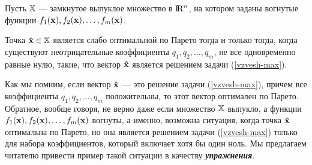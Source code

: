     \begin{teo}\label{par-opt-neobh-i-dost}
Пусть $\mathbb{X}$ --- замкнутое выпуклое множество в ${\rm I\!R}^n$, на котором
заданы вогнутые функции $f_1(\mathbf{x}), f_2(\mathbf{x}), \ldots,
f_m(\mathbf{x})$.

Точка $\mathbf{\hat x} \in \mathbb{X}$ является слабо оптимальной по Парето тогда и только тогда,
когда существуют неотрицательные коэффициенты $q_1, q_2, \ldots, q_m$, не все одновременно
равные нулю, такие, что вектор $\mathbf{\hat x}$ является решением задачи (\ref{vzvesh-max}).

\end{teo}

    Как мы помним, если вектор $\mathbf{\hat x}$ --- это решение задачи
    (\ref{vzvesh-max}), причем все коэффициенты $q_1, q_2, \ldots,
    q_m$ положительны, то этот вектор оптимален по Парето. Обратное,
    вообще говоря, не верно даже если множество $\mathbb{X}$
    выпукло, а функции
    $f_1(\mathbf{x}), f_2(\mathbf{x}), \ldots,  f_m(\mathbf{x})$
    вогнуты, а именно, возможна ситуация, когда точка $\mathbf{\hat x}$
    оптимальна по Парето, но она является решением задачи
    (\ref{vzvesh-max}) только для набора коэффициентов, который
    включает хотя бы один ноль. Мы предлагаем читателю привести пример такой
    ситуации в качеству \emph{\textbf{упражнения}}.

